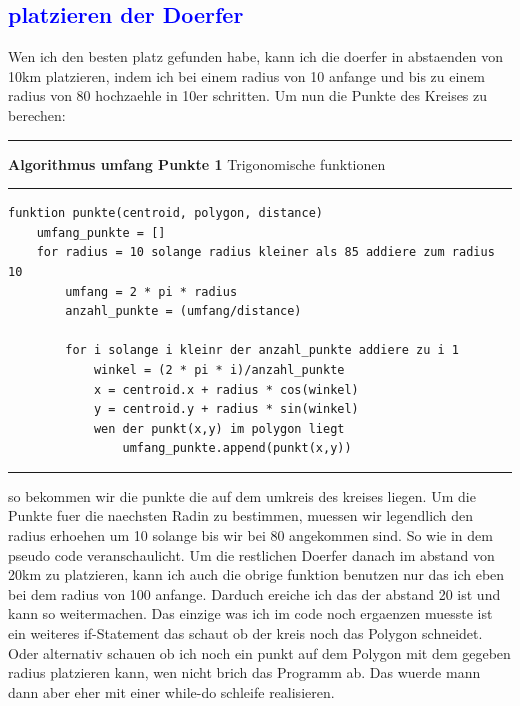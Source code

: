 \documentclass{article}
\begin{document}
\subsection{\textcolor{blue}{platzieren der Doerfer}}
Wen ich den besten platz gefunden habe, kann ich die doerfer in abstaenden von 10km platzieren, indem ich bei einem radius von 10 anfange und bis zu einem radius von 80 hochzaehle in 10er schritten. Um nun die Punkte des Kreises zu berechen:
\vspace{5pt}
\hrule
\vspace{1.5pt}
\large{\textbf{Algorithmus umfang Punkte 1} Trigonomische funktionen}
\vspace{1.5pt}
\hrule
\begin{verbatim}
funktion punkte(centroid, polygon, distance)
	umfang_punkte = []
	for radius = 10 solange radius kleiner als 85 addiere zum radius 10
		umfang = 2 * pi * radius
		anzahl_punkte = (umfang/distance)
		
		for i solange i kleinr der anzahl_punkte addiere zu i 1
			winkel = (2 * pi * i)/anzahl_punkte
			x = centroid.x + radius * cos(winkel)
			y = centroid.y + radius * sin(winkel)
			wen der punkt(x,y) im polygon liegt
				umfang_punkte.append(punkt(x,y))
\end{verbatim}
\hrule
\vspace{5pt}
so bekommen wir die punkte die auf dem umkreis des kreises liegen. Um die Punkte fuer die naechsten Radin zu bestimmen, muessen wir legendlich den radius erhoehen um 10 solange bis wir bei 80 angekommen sind. So wie in dem pseudo code veranschaulicht. Um die restlichen Doerfer danach im abstand von 20km zu platzieren, kann ich auch die obrige funktion benutzen nur das ich eben bei dem radius von 100 anfange. Darduch ereiche ich das der abstand 20 ist und kann so weitermachen. Das einzige was ich im code noch ergaenzen muesste ist ein weiteres if-Statement das schaut ob der kreis noch das Polygon schneidet. Oder alternativ schauen ob ich noch ein punkt auf dem Polygon mit dem gegeben radius platzieren kann, wen nicht brich das Programm ab. Das wuerde mann dann aber eher mit einer while-do schleife realisieren. 
\end{document}
